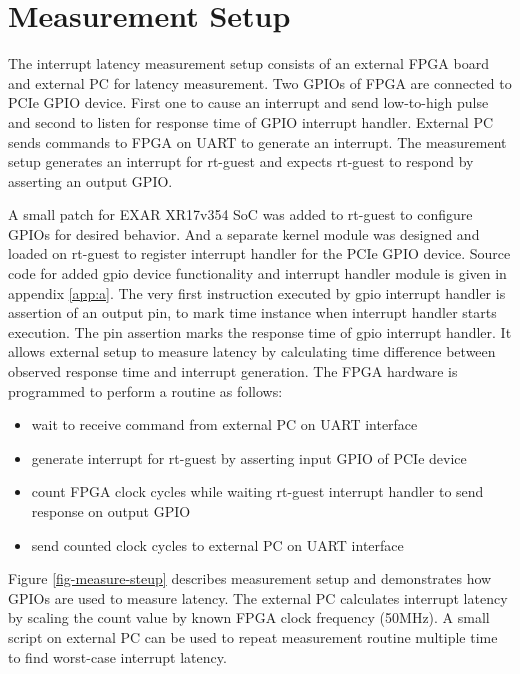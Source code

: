 \section{Measurement Setup} \label{sec:measurement-setup}
The interrupt latency measurement setup consists of an external FPGA board \cite{terasic-de0nano} and external PC for latency measurement.
Two GPIOs of FPGA are connected to PCIe GPIO device. First one to cause an interrupt and send low-to-high pulse and second to listen for
response time of GPIO interrupt handler. External PC sends commands to FPGA on UART to generate an interrupt.
The measurement setup generates an interrupt for rt-guest and expects rt-guest to respond by asserting an output GPIO.

A small patch for EXAR XR17v354 SoC was added to rt-guest to configure GPIOs for desired behavior.
And a separate kernel module was designed and loaded on rt-guest to register interrupt handler for the PCIe GPIO device.
Source code for added gpio device functionality and interrupt handler module is given in appendix \ref{app:a}.
The very first instruction executed by gpio interrupt handler is assertion of an output pin, to mark time instance when interrupt handler starts execution.
The pin assertion marks the response time of gpio interrupt handler.
It allows external setup to measure latency by calculating time difference between observed response time and interrupt generation.
The FPGA hardware is programmed to perform a routine as follows:
\begin {itemize}
	\item {wait to receive command from external PC on UART interface}
	\item {generate interrupt for rt-guest by asserting input GPIO of PCIe device}
	\item {count FPGA clock cycles while waiting rt-guest interrupt handler to send response on output GPIO}
	\item {send counted clock cycles to external PC on UART interface}
\end {itemize}

Figure \ref{fig-measure-steup} describes measurement setup and demonstrates how GPIOs are used to measure latency.
The external PC calculates interrupt latency by scaling the count value by known FPGA clock frequency (50MHz). 
A small script on external PC can be used to repeat measurement routine multiple time to find worst-case interrupt latency.





